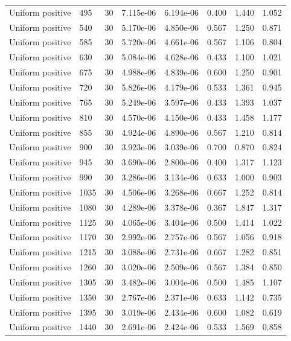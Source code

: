 \begin{scriptsize}
\begin{longtable}{llrrrrrr}
Uniform positive & 495 & 30 & 7.115e-06 & 6.194e-06 & 0.400 & 1.440 & 1.052 \\
Uniform positive & 540 & 30 & 5.170e-06 & 4.850e-06 & 0.567 & 1.250 & 0.871 \\
Uniform positive & 585 & 30 & 5.720e-06 & 4.661e-06 & 0.567 & 1.106 & 0.804 \\
Uniform positive & 630 & 30 & 5.084e-06 & 4.628e-06 & 0.433 & 1.100 & 1.021 \\
Uniform positive & 675 & 30 & 4.988e-06 & 4.839e-06 & 0.600 & 1.250 & 0.901 \\
Uniform positive & 720 & 30 & 5.826e-06 & 4.179e-06 & 0.533 & 1.361 & 0.945 \\
Uniform positive & 765 & 30 & 5.249e-06 & 3.597e-06 & 0.433 & 1.393 & 1.037 \\
Uniform positive & 810 & 30 & 4.570e-06 & 4.150e-06 & 0.433 & 1.458 & 1.177 \\
Uniform positive & 855 & 30 & 4.924e-06 & 4.890e-06 & 0.567 & 1.210 & 0.814 \\
Uniform positive & 900 & 30 & 3.923e-06 & 3.039e-06 & 0.700 & 0.870 & 0.824 \\
Uniform positive & 945 & 30 & 3.690e-06 & 2.800e-06 & 0.400 & 1.317 & 1.123 \\
Uniform positive & 990 & 30 & 3.286e-06 & 3.134e-06 & 0.633 & 1.000 & 0.903 \\
Uniform positive & 1035 & 30 & 4.506e-06 & 3.268e-06 & 0.667 & 1.252 & 0.814 \\
Uniform positive & 1080 & 30 & 4.289e-06 & 3.378e-06 & 0.367 & 1.847 & 1.317 \\
Uniform positive & 1125 & 30 & 4.065e-06 & 3.404e-06 & 0.500 & 1.414 & 1.022 \\
Uniform positive & 1170 & 30 & 2.992e-06 & 2.757e-06 & 0.567 & 1.056 & 0.918 \\
Uniform positive & 1215 & 30 & 3.088e-06 & 2.731e-06 & 0.667 & 1.282 & 0.851 \\
Uniform positive & 1260 & 30 & 3.020e-06 & 2.509e-06 & 0.567 & 1.384 & 0.850 \\
Uniform positive & 1305 & 30 & 3.482e-06 & 3.004e-06 & 0.500 & 1.485 & 1.107 \\
Uniform positive & 1350 & 30 & 2.767e-06 & 2.371e-06 & 0.633 & 1.142 & 0.735 \\
Uniform positive & 1395 & 30 & 3.019e-06 & 2.434e-06 & 0.600 & 1.082 & 0.619 \\
Uniform positive & 1440 & 30 & 2.691e-06 & 2.424e-06 & 0.533 & 1.569 & 0.858 \\

\end{longtable}
\end{scriptsize}

